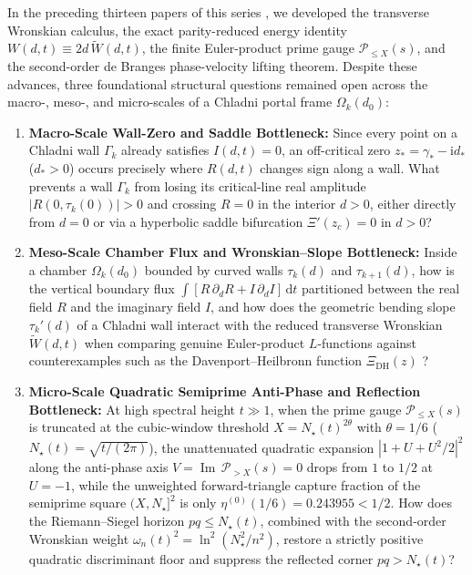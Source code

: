 \documentclass[11pt,reqno]{amsart}
\theoremstyle{definition}
\theoremstyle{remark}
\numberwithin{equation}{section}
\newcommand{\dd}{\mathrm{d}}
\newcommand{\ii}{\mathrm{i}}
\newcommand{\ImPt}{\operatorname{Im}}
\newcommand{\DHf}{\mathrm{DH}}
\begin{document}
In the preceding thirteen papers of this series \cite{Missiaen2026P1,Missiaen2026P2,Missiaen2026P3,Missiaen2026P4,Missiaen2026P5,Missiaen2026P6,Missiaen2026P7,Missiaen2026P8,Missiaen2026P9,Missiaen2026P10,Missiaen2026P11,Missiaen2026P12,Missiaen2026P13}, we developed the transverse Wronskian calculus, the exact parity-reduced energy identity $W(d,t) \equiv 2d\,\widetilde{W}(d,t)$, the finite Euler-product prime gauge $\mathcal{P}_{\le X}(s)$, and the second-order de Branges phase-velocity lifting theorem. Despite these advances, three foundational structural questions remained open across the macro-, meso-, and micro-scales of a Chladni portal frame $\Omega_k(d_0)$:
\begin{enumerate}[label=(\roman*),leftmargin=2.2em]
\item \textbf{Macro-Scale Wall-Zero and Saddle Bottleneck:} Since every point on a Chladni wall $\Gamma_k$ already satisfies $I(d,t)=0$, an off-critical zero $z_* = \gamma_* - \ii d_*$ ($d_* > 0$) occurs precisely where $R(d,t)$ changes sign along a wall. What prevents a wall $\Gamma_k$ from losing its critical-line real amplitude $|R(0,\tau_k(0))| > 0$ and crossing $R=0$ in the interior $d>0$, either directly from $d=0$ or via a hyperbolic saddle bifurcation $\Xi'(z_c)=0$ in $d>0$?
\item \textbf{Meso-Scale Chamber Flux and Wronskian--Slope Bottleneck:} Inside a chamber $\Omega_k(d_0)$ bounded by curved walls $\tau_k(d)$ and $\tau_{k+1}(d)$, how is the vertical boundary flux $\int [R\,\partial_d R + I\,\partial_d I]\,\dd t$ partitioned between the real field $R$ and the imaginary field $I$, and how does the geometric bending slope $\tau_k'(d)$ of a Chladni wall interact with the reduced transverse Wronskian $\widetilde{W}(d,t)$ when comparing genuine Euler-product $L$-functions against counterexamples such as the Davenport--Heilbronn function $\Xi_{\DHf}(z)$ \cite{DavenportHeilbronn1936}?
\item \textbf{Micro-Scale Quadratic Semiprime Anti-Phase and Reflection Bottleneck:} At high spectral height $t \gg 1$, when the prime gauge $\mathcal{P}_{\le X}(s)$ is truncated at the cubic-window threshold $X = N_\star(t)^{2\theta}$ with $\theta = 1/6$ ($N_\star(t) = \sqrt{t/(2\pi)}$), the unattenuated quadratic expansion $|1 + U + U^2/2|^2$ along the anti-phase axis $V = \ImPt\,\mathcal{P}_{>X}(s)=0$ drops from $1$ to $1/2$ at $U=-1$, while the unweighted forward-triangle capture fraction of the semiprime square $(X,N_\star]^2$ is only $\eta^{(0)}(1/6) = 0.243955 < 1/2$. How does the Riemann--Siegel horizon $pq \le N_\star(t)$, combined with the second-order Wronskian weight $\omega_n(t)^2 = \ln^2(N_\star^2/n^2)$, restore a strictly positive quadratic discriminant floor and suppress the reflected corner $pq > N_\star(t)$?
\end{enumerate}
\end{document}

